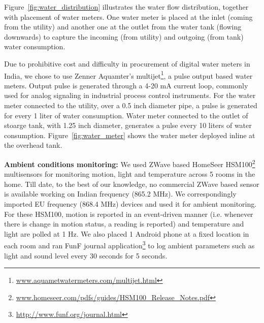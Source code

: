 \documentclass[10pt]{sensys-proc}
\newcommand{\figref}[1]{Figure~\ref{#1}}
\begin{document}
\figref{fig:water_distribution} illustrates the water flow distribution, together with placement of water meters. One water meter is placed at the inlet (coming from the utility) and another one at the outlet from the water tank (flowing downwards) to capture the incoming (from utility) and outgoing (from tank) water consumption. 

Due to prohibitive cost and difficulty in procurement of digital water meters in India, we chose to use Zenner Aquamter's multijet\footnote{\url{www.aquametwatermeters.com/multijet.html}}, a pulse output based water meters. Output pulse is generated through a 4-20 mA current loop, commonly used for analog signaling in industrial process control instruments. For the water meter connected to the utility, over a 0.5 inch diameter pipe, a pulse is generated for every 1 liter of water consumption. Water meter connected to the outlet of stoarge tank, with 1.25 inch diameter, generates a pulse every 10 liters of water consumption. %
\figref{fig:water_meter} shows the water meter deployed inline at the overhead tank.

\noindent \textbf{Ambient conditions monitoring:} We used ZWave based HomeSeer HSM100\footnote{\url{www.homeseer.com/pdfs/guides/HSM100_Release_Notes.pdf}} multisensors for monitoring motion, light and temperature across 5 rooms in the home. Till date, to the best of our knowledge, no commercial ZWave based sensor is available working on Indian frequency (865.2 MHz). We correspondingly imported EU frequency (868.4 MHz) devices and used it for ambient monitoring. For these HSM100, motion is reported in an event-driven manner (i.e. whenever there is change in motion status, a reading is reported) and temperature and light are polled at 1 Hz. We also placed 1 Android phone at a fixed location in each room and ran FunF journal application\footnote{\url{http://www.funf.org/journal.html}} to log ambient parameters such as light and sound level every 30 seconds for 5 seconds.
\end{document}
